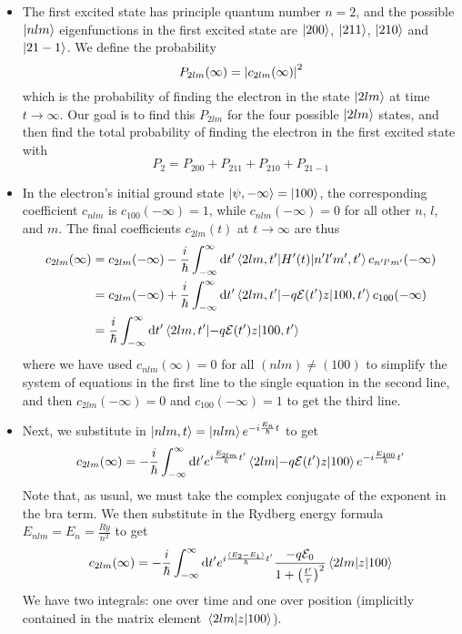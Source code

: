\documentclass[11pt, a4paper]{article}
\newcommand{\diff}{\mathop{}\!\mathrm{d}} %
\newcommand{\p}{\psi}  %
\newcommand{\E}{\mathcal{E}}  %
\begin{document}
	
\begin{itemize}
	\item The first excited state has principle quantum number $ n = 2 $, and the possible $ \ket{nlm} $ eigenfunctions in the first excited state are $ \ket{200} $, $ \ket{211} $, $ \ket{210} $ and $ \ket{21-1} $. We define the probability
	\begin{equation*}
		P_{2lm}(\infty) = \abs{c_{2lm}(\infty)}^{2}
	\end{equation*} 
	which is the probability of finding the electron in the state $ \ket{2lm} $ at time $ t \to \infty $. Our goal is to find this $ P_{2lm} $ for the four possible $ \ket{2lm} $ states, and then find the total probability of finding the electron in the first excited state with
	\begin{equation*}
		P_{2} = P_{200} + P_{211} + P_{210} + P_{21-1}
	\end{equation*}
	
	\item In the electron's initial ground state $ \ket{\p, -\infty} = \ket{100} $, the corresponding coefficient $ c_{nlm} $ is $ c_{100}(-\infty) = 1 $, while $ c_{nlm}(-\infty) = 0 $ for all other $ n $, $ l $, and $ m $. The final coefficients $ c_{2lm}(t) $ at $ t \to \infty $ are thus
	\begin{align*}
		c_{2lm}(\infty) &= c_{2lm}(-\infty) - \frac{i}{\hbar} \int_{-\infty}^{\infty} \diff t' \mel{2lm, t'}{H'(t)}{n'l'm', t'}c_{n'l'm'}(-\infty)\\
		& = c_{2lm}(-\infty)  + \frac{i}{\hbar} \int_{-\infty}^{\infty} \diff t' \mel{2lm, t'}{-q\E(t')z}{100, t'}c_{100}(-\infty)\\
		& = \frac{i}{\hbar} \int_{-\infty}^{\infty} \diff t' \mel{2lm, t'}{-q\E(t')z}{100, t'}
	\end{align*}
	where we have used $ c_{nlm}(\infty) = 0 $ for all $ (nlm) \neq (100) $ to simplify the system of equations in the first line to the single equation in the second line, and then $ c_{2lm}(-\infty) = 0 $ and $ c_{100}(-\infty) = 1 $ to get the third line.
	
	\item Next, we substitute in $ \ket{nlm, t} = \ket{nlm}e^{-i\frac{E_{n}}{\hbar}t} $ to get 
	\begin{equation*}
		c_{2lm}(\infty) = - \frac{i}{\hbar} \int_{-\infty}^{\infty} \diff t'  e^{i\frac{E_{2lm}}{\hbar}t'} \mel{2lm}{-q\E(t')z}{100}e^{-i\frac{E_{100}}{\hbar}t'}
	\end{equation*}
	Note that, as usual, we must take the complex conjugate of the exponent in the bra term. We then substitute in the Rydberg energy formula $ E_{nlm} = E_{n} = \frac{\si{Ry}}{n^{2}} $ to get
	\begin{equation*}
		c_{2lm}(\infty) = - \frac{i}{\hbar} \int_{-\infty}^{\infty} \diff t'  e^{i\frac{(E_{2} - E_{1})}{\hbar}t'} \frac{-q \E_{0}}{1 + \left(\frac{t'}{\tau}\right)^{2}}\mel{2lm}{z}{100}
	\end{equation*}
	We have two integrals: one over time and one over position (implicitly contained in the matrix element $ \mel{2lm}{z}{100} $).
	

\end{itemize}
\end{document}
